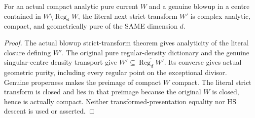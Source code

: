 \begin{theorem}
\label{hir:actual-singular-blowup-next-current-geometry}
\leanok
For an actual compact analytic pure current $W$ and a genuine blowup in a
centre contained in $W\setminus\operatorname{Reg}_dW$, the literal next strict
transform $W'$ is complex analytic, compact, and geometrically pure of the
SAME dimension $d$.
\end{theorem}
\begin{proof}
The actual blowup strict-transform theorem gives analyticity of the literal
closure defining $W'$. The original pure regular-density dictionary and the
genuine singular-centre density transport give $W'\subseteq
\overline{\operatorname{Reg}_dW'}$. Its converse gives actual geometric purity,
including every regular point on the exceptional divisor. Genuine properness
makes the preimage of compact $W$ compact. The literal strict transform is
closed and lies in that preimage because the original $W$ is closed, hence
is actually compact. Neither transformed-presentation equality nor HS descent
is used or asserted.
\end{proof}

